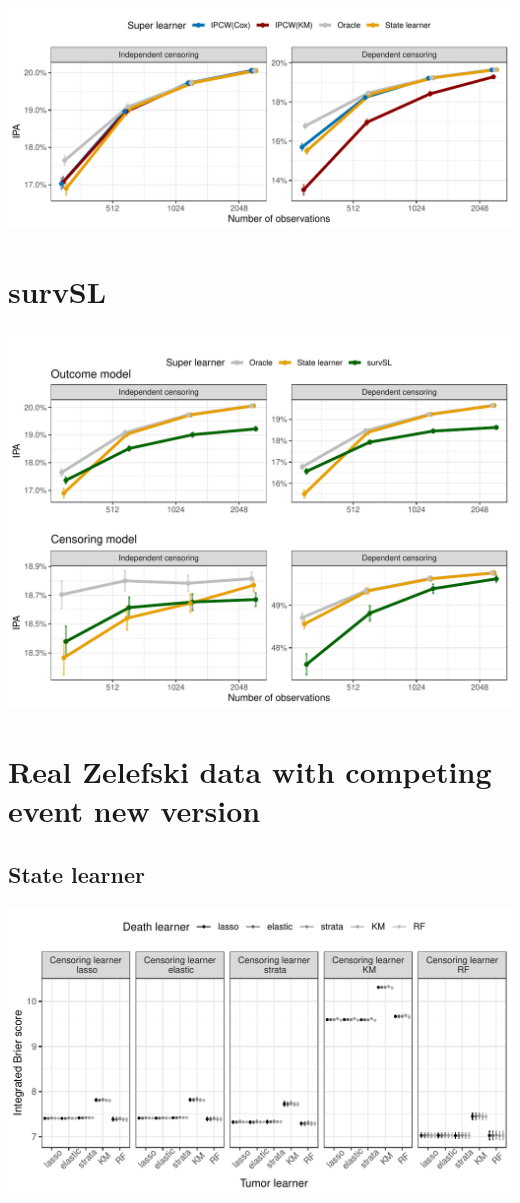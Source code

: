 \documentclass[11pt]{article}
\begin{document}
\begin{center}
\includegraphics[width=.9\linewidth]{experiment-fig-sl-ipcw.pdf}
\end{center}

\section{survSL}
\label{sec:org8951f83}
\begin{center}
\includegraphics[width=.9\linewidth]{experiment-fig-sl-survSL.pdf}
\end{center}


\section{Real Zelefski data with competing event new version}
\label{sec:org1137d4f}

\subsection{State learner}
\label{sec:orgec9334e}
\begin{center}
\includegraphics[width=.9\linewidth]{zelefski-real-data.pdf}
\end{center}
\end{document}
